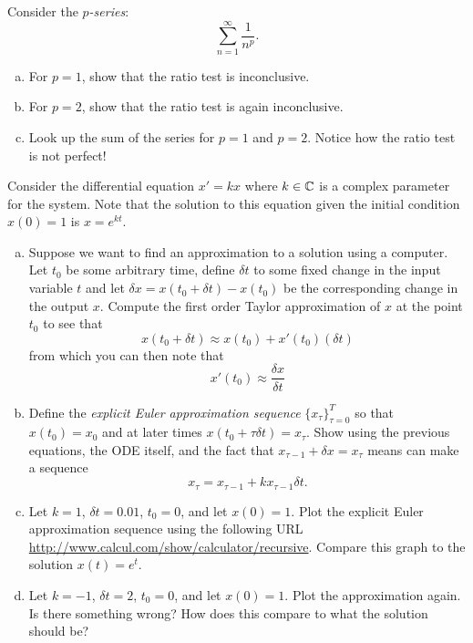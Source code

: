\begin{problem}
Consider the \emph{$p$-series}:
\[
\sum_{n=1}^\infty \frac{1}{n^p}.
\]
\begin{enumerate}[(a)]
    \item For $p=1$, show that the ratio test is inconclusive.
    \item For $p=2$, show that the ratio test is again inconclusive.
    \item Look up the sum of the series for $p=1$ and $p=2$.  Notice how the ratio test is not perfect!
\end{enumerate}
\end{problem}

\begin{problem}
	Consider the differential equation $x'=kx$ where $k\in \mathbb{C}$ is a complex parameter for the system. Note that the solution to this equation given the initial condition $x(0)=1$ is $x=e^{kt}$.
	\begin{enumerate}[(a)]
		\item Suppose we want to find an approximation to a solution using a computer. Let $t_0$ be some arbitrary time, define $\delta t$ to some fixed change in the input variable $t$ and let $\delta x =x(t_0+\delta t)-x(t_0)$ be the corresponding change in the output $x$. Compute the first order Taylor approximation of $x$ at the point $t_0$ to see that
		\begin{equation}
			\label{eq:1}
		x(t_0+\delta t) \approx x(t_0)+x'(t_0)(\delta t)
		\end{equation}
		from which you can then note that
		\begin{equation}
			\label{eq:2}
		x'(t_0) \approx \frac{\delta x}{\delta t}
		\end{equation}
	\item Define the \emph{explicit Euler approximation sequence} $\{x_\tau\}_{\tau=0}^T$ so that $x(t_0)=x_0$ and at later times $x(t_0+\tau\delta t)=x_\tau$. Show using the previous equations, the ODE itself, and the fact that $x_{\tau-1}+\delta x = x_{\tau}$ means can make a sequence
	\[
	x_{\tau} = x_{\tau-1} + kx_{\tau-1} \delta t.
	\]
	\item Let $k=1$, $\delta t = 0.01$, $t_0=0$, and let $x(0)=1$. Plot the explicit Euler approximation sequence using the following URL \url{http://www.calcul.com/show/calculator/recursive}. Compare this graph to the solution $x(t)=e^{t}$.
	\item Let $k=-1$, $\delta t = 2$, $t_0=0$, and let $x(0)=1$. Plot the approximation again. Is there something wrong? How does this compare to what the solution should be?
	\end{enumerate}
\end{problem}

